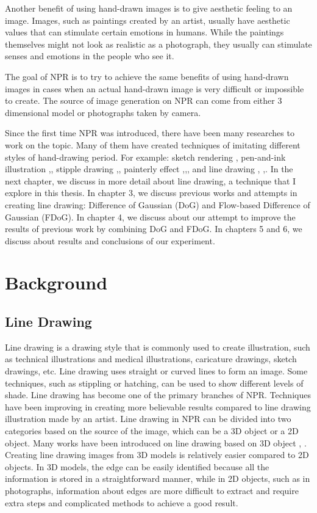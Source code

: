 Another benefit of using hand-drawn images is to give aesthetic feeling to an image. Images, such as paintings created by an artist, usually have aesthetic values that can stimulate certain emotions in humans. While the paintings themselves might not look as realistic as a photograph, they usually can stimulate senses and emotions in the people who see it.

The goal of NPR is to try to achieve the same benefits of using hand-drawn images in cases when an actual hand-drawn image is very difficult or impossible to create. The source of image generation on NPR can come from either 3 dimensional model or photographs taken by camera.

Since the first time NPR was introduced, there have been many researches to work on the topic. Many of them have created techniques of imitating different styles of hand-drawing period. For example: sketch rendering \cite{strothotte94}, pen-and-ink illustration \cite{winkenbach94},\cite{salisbury94}, stipple drawing \cite{secord02},\cite{deussen00}, painterly effect \cite{litwinowicz97},\cite{hertzmann98},\cite{hays04}, and line drawing \cite{decarlo03}, \cite{sousa03},\cite{kang07}. In the next chapter, we discuss in more detail about line drawing, a technique that I explore in this thesis. In chapter 3, we discuss previous works and attempts in creating line drawing: Difference of Gaussian (DoG) and Flow-based Difference of Gaussian (FDoG). In chapter 4, we discuss about our attempt to improve the results of previous work by combining DoG and FDoG. In chapters 5 and 6, we discuss about results and conclusions of our experiment.

\chapter{Background}

\section{Line Drawing} 
Line drawing is a drawing style that is commonly used to create illustration, such as technical illustrations and medical illustrations, caricature drawings, sketch drawings, etc. Line drawing uses straight or curved lines to form an image. Some techniques, such as stippling or hatching, can be used to show different levels of shade. Line drawing has become one of the primary branches of NPR. Techniques have been improving in creating more believable results compared to line drawing illustration made by an artist. Line drawing in NPR can be divided into two categories based on the source of the image, which can be a 3D object or a 2D object. Many works have been introduced on line drawing based on 3D object \cite{decarlo03}, \cite{sousa03}. Creating line drawing images from 3D models is relatively easier compared to 2D objects. In 3D models, the edge can be easily identified because all the information is stored in a straightforward manner, while in 2D objects, such as in photographs, information about edges are more difficult to extract and require extra steps and complicated methods to achieve a good result.

